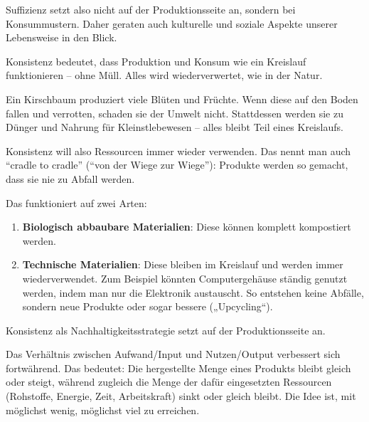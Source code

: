 \begin{myexercise}
\begin{textBox}[title = Suffizienz -- anders konsumieren für ein gutes Leben für alle \cite{suffizienz}]
        Suffizienz setzt also nicht auf der Produktionsseite an, sondern bei Konsummustern. Daher geraten auch kulturelle und soziale Aspekte unserer Lebensweise in den Blick.
    \end{textBox}

    \begin{textBox}[title = Konsistenz -- anders herstellen und
            nutzen \cite{konsistenz}]

        Konsistenz bedeutet, dass Produktion und Konsum wie ein Kreislauf funktionieren -- ohne Müll. Alles wird wiederverwertet, wie in der Natur.

        Ein Kirschbaum produziert viele Blüten und Früchte. Wenn diese auf den Boden fallen und verrotten, schaden sie der Umwelt nicht. Stattdessen werden sie zu Dünger und Nahrung
        für Kleinstlebewesen -- alles bleibt Teil eines Kreislaufs.

        Konsistenz will also Ressourcen immer wieder verwenden. Das nennt man auch \enquote{cradle to cradle} (\enquote{von der Wiege zur Wiege}): Produkte werden so gemacht, dass sie nie zu Abfall werden.

        Das funktioniert auf zwei Arten:

        \begin{enumerate}
            \item \textbf{Biologisch abbaubare Materialien}: Diese können komplett kompostiert werden.

            \item \textbf{Technische Materialien}: Diese bleiben im Kreislauf und werden immer wiederverwendet. Zum Beispiel könnten Computergehäuse ständig genutzt werden, indem man nur die Elektronik austauscht. So entstehen keine Abfälle, sondern neue Produkte oder sogar bessere („Upcycling“).
        \end{enumerate}
        Konsistenz als Nachhaltigkeitsstrategie setzt auf der Produktionsseite an.
    \end{textBox}

    \begin{textBox}[title = Effizienz -- besser produzieren mit weniger Ressourcenverbrauch und CO$_2$-Ausstoss \cite{effizienz}]


        Das Verhältnis zwischen Aufwand/Input und Nutzen/Output verbessert sich fortwährend. Das bedeutet: Die hergestellte Menge eines Produkts bleibt gleich oder steigt, während zugleich die Menge der dafür eingesetzten Ressourcen (Rohstoffe, Energie, Zeit, Arbeitskraft) sinkt oder gleich bleibt. Die Idee ist, mit möglichst wenig, möglichst viel zu erreichen.


\end{textBox}
\end{myexercise}
